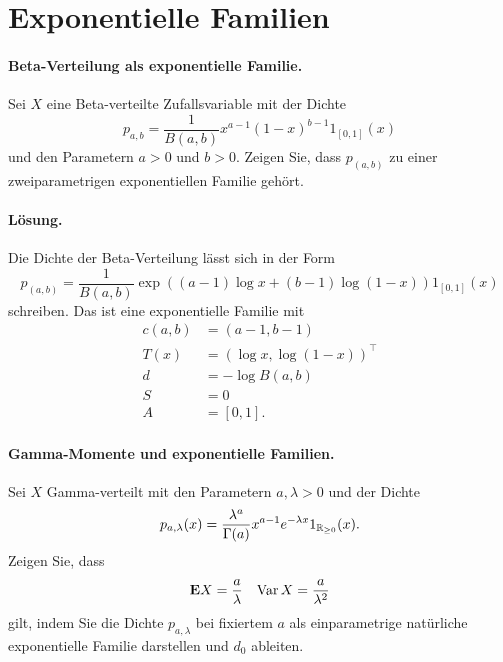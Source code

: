 \section{Exponentielle Familien}


\paragraph{Beta-Verteilung als exponentielle Familie.}
Sei $X$ eine Beta-verteilte Zufallsvariable mit der Dichte
\begin{equation*}
    p_{a,b} = \frac{1}{B(a,b)} x^{a-1} (1-x)^{b-1} 1_{[0,1]}(x)
\end{equation*}
und den Parametern $a>0$ und $b>0$.
Zeigen Sie, dass $p_{(a,b)}$ zu einer zweiparametrigen exponentiellen
Familie gehört.

\paragraph*{Lösung.} Die Dichte der Beta-Verteilung lässt sich in der Form
\begin{equation*}
    p_{(a,b)} = \frac{1}{B(a,b)} \exp \left( 
        (a-1) \log x + (b-1) \log (1-x) 
        \right) 1_{[0,1]}(x)
\end{equation*}
schreiben. Das ist eine exponentielle Familie mit 
\begin{align*}
    c(a,b) &= \left( a-1, b-1 \right) \\
    T(x) &= \left( \log x, \log (1-x) \right)^\top \\
    d &= - \log B(a,b) \\
    S &= 0 \\
    A &= [0,1].
\end{align*}


\paragraph{Gamma-Momente und exponentielle Familien.}
Sei $X$ Gamma-verteilt mit den Parametern $a,\lambda>0$ und der Dichte
\begin{equation*}
    p_{a,\lambda} (x) = \frac{\lambda^a}{\Gamma(a)} x^{a-1} e^{-\lambda x} 1_{\mathbb R_{\geq 0}} (x).
\end{equation*}
Zeigen Sie, dass 
\begin{align*}
    \mathbf{E} X = \frac{a}{\lambda} && \operatorname{Var} X = \frac{a}{\lambda^2} 
\end{align*}
gilt, indem Sie die Dichte $p_{a,\lambda}$ bei fixiertem $a$ als einparametrige
natürliche exponentielle Familie darstellen und $d_0$ ableiten. 


